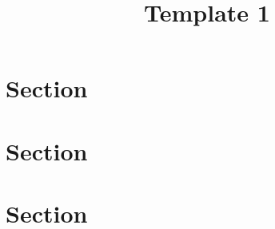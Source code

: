 \documentclass[12pt]{article}
\title{Template 1}
\begin{document}
\maketitle
\section{Section}

\section{Section}

\section{Section}
\end{document}
